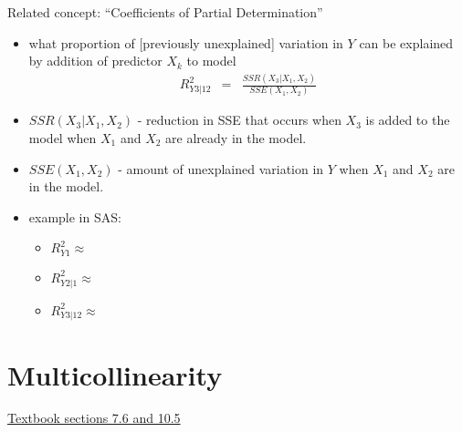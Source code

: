 \documentclass[12pt]{notes}
\begin{document}
\begin{minipage}[l][3cm][c]{\textwidth}
\begin{comment}
\end{comment}
\end{minipage}

Related concept: ``Coefficients of Partial Determination''
\begin{itemize}
  \item what proportion of [previously unexplained] variation in $Y$
  can be explained by addition of predictor $X_k$ to model
    \begin{eqnarray}
      R^2_{Y3|12} & = & \frac{SSR(X_3 | X_1, X_2)}{SSE(X_1,X_2)}
      \nonumber
    \end{eqnarray}
    
    \bi
    \item $SSR(X_3 | X_1, X_2)$ - reduction in SSE that occurs when $X_3$ is added to the model when $X_1$ and $X_2$ are already in the model. 
    \item $SSE(X_1, X_2)$ - amount of unexplained variation in $Y$ when $X_1$ and $X_2$ are in the model. 
    \ei
    
  \item example in SAS:
    \begin{itemize}
       \item $R^2_{Y1} \approx $%
       \item $R^2_{Y2|1} \approx $%
       \item $R^2_{Y3|12} \approx $%
    \end{itemize}
\end{itemize}

\begin{minipage}[l][3cm][c]{\textwidth}
\begin{comment}
\end{comment}
\end{minipage}

\section{Multicollinearity}
\underline{Textbook sections 7.6 and 10.5}\\
\end{document}
